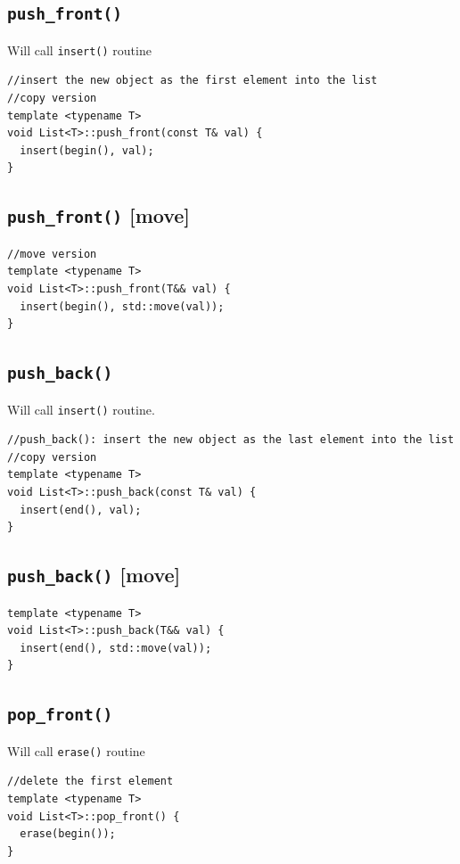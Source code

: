 \documentclass[11pt]{book}
\begin{document}
\subsection{\texttt{push\_front()}}
\label{sec:org7c56b7f}
Will call \texttt{insert()} routine
\begin{verbatim}
//insert the new object as the first element into the list
//copy version 
template <typename T>
void List<T>::push_front(const T& val) {
  insert(begin(), val);
}
\end{verbatim}
\subsection{\texttt{push\_front()} [move]}
\label{sec:orgf5ae1af}
\begin{verbatim}
//move version 
template <typename T>
void List<T>::push_front(T&& val) {
  insert(begin(), std::move(val));
}
\end{verbatim}
\subsection{\texttt{push\_back()}}
\label{sec:org1c9d1dc}
Will call \texttt{insert()} routine.
\begin{verbatim}
//push_back(): insert the new object as the last element into the list
//copy version 
template <typename T>
void List<T>::push_back(const T& val) {
  insert(end(), val);
}
\end{verbatim}
\subsection{\texttt{push\_back()} [move]}
\label{sec:org0a6985d}
\begin{verbatim}
template <typename T>
void List<T>::push_back(T&& val) {
  insert(end(), std::move(val));
}
\end{verbatim}
\subsection{\texttt{pop\_front()}}
\label{sec:org52e95cb}
Will call \texttt{erase()} routine
\begin{verbatim}
//delete the first element 
template <typename T>
void List<T>::pop_front() {
  erase(begin());
}
\end{verbatim}
\end{document}

